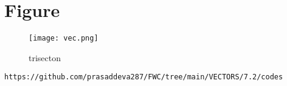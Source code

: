 \documentclass[12pt]{article}
\begin{document}
\section{Figure}
\begin{figure}[h]
\centering
\texttt{[image: vec.png]}
\caption{trisecton}
		\label{fig:Figure}
\end{figure}
\begin{lstlisting}
https://github.com/prasaddeva287/FWC/tree/main/VECTORS/7.2/codes
\end{lstlisting}
\end{document}
